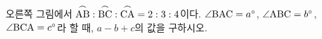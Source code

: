 \noindent\begin{minipage}[t]{0.58\linewidth}\vspace{0pt}\raggedright 오른쪽 그림에서 $\overset{\frown}{\mathrm{AB}}:\overset{\frown}{\mathrm{BC}}:\overset{\frown}{\mathrm{CA}}=2:3:4$이다. $\angle\mathrm{BAC}=a^\circ$, $\angle\mathrm{ABC}=b^\circ$, $\angle\mathrm{BCA}=c^\circ$라 할 때, $a-b+c$의 값을 구하시오.\end{minipage}\hfill\begin{minipage}[t]{0.4\linewidth}\vspace{0pt}\centering \resizebox{\ifdim\width>\linewidth\linewidth\else\width\fi}{!}{}\end{minipage}\par
